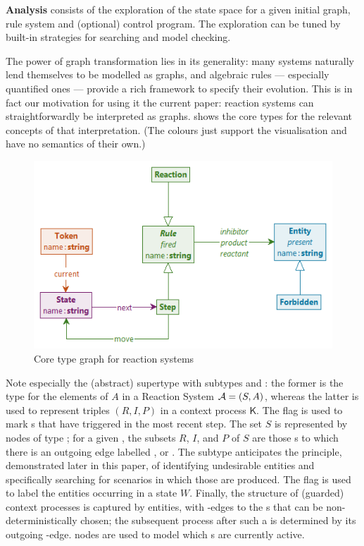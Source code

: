 \textbf{Analysis} consists of the exploration of the state space for a given initial graph, rule system and (optional) control program. The exploration can be tuned by built-in strategies for searching and model checking.

\smallskip\noindent
The power of graph transformation lies in its generality: many systems naturally lend themselves to be modelled as graphs, and algebraic rules --- especially quantified ones --- provide a rich framework to specify their evolution. This is in fact our motivation for using it the current paper: reaction systems can straightforwardly be interpreted as graphs.  shows the core types for the relevant concepts of that interpretation. (The colours just support the visualisation and have no semantics of their own.)

\begin{figure}
\centering
\includegraphics[scale=.5]{figs/core-type}
\caption{Core type graph for reaction systems}
\label{fig:core-type}
\end{figure}
%
Note especially the (abstract) supertype \Rule with subtypes \Reaction and \Step: the former is the type for the elements of $A$ in a Reaction System ${\cal A}=(S,A)$, whereas the latter is used to represent triples $(R,I,P)$ in a context process $\mathsf K$. The flag \fired is used to mark \Rule{}s that have triggered in the most recent step. The set $S$ is represented by nodes of type \Entity; for a given \Rule, the subsets $R$, $I$, and $P$ of $S$ are those \Entity{}s to which there is an outgoing edge labelled \reactant, \inhibitor or \product. The subtype \Forbidden anticipates the principle, demonstrated later in this paper, of identifying undesirable entities and specifically searching for scenarios in which those are produced. The flag \present is used to label the entities occurring in a state $W$. Finally, the structure of (guarded) context processes is captured by \State entities, with \nextt-edges to the \Step{}s that can be non-deterministically chosen; the subsequent process after such a \Step is determined by its outgoing \move-edge. \Token nodes are used to model which \State{}s are currently active.

